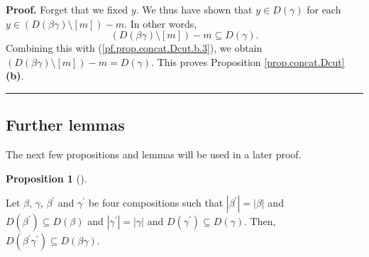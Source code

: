 \documentclass[numbers=enddot,12pt,final,onecolumn,notitlepage]{scrartcl}%
\theoremstyle{definition}
\newtheorem{prop}[theo]{Proposition}
\newenvironment{proposition}[1][]
{\begin{prop}[#1]\begin{leftbar}}
{\end{leftbar}\end{prop}}
\newenvironment{proof}[1][Proof]{\noindent\textbf{#1.} }{\ \rule{0.5em}{0.5em}}
\begin{document}
\begin{proof}
Forget that we fixed $y$. We thus have shown that $y\in D\left(
\gamma\right)  $ for each $y\in\left(  D\left(  \beta\gamma\right)
\setminus\left[  m\right]  \right)  -m$. In other words,%
\[
\left(  D\left(  \beta\gamma\right)  \setminus\left[  m\right]  \right)
-m\subseteq D\left(  \gamma\right)  .
\]
Combining this with (\ref{pf.prop.concat.Dcut.b.3}), we obtain $\left(
D\left(  \beta\gamma\right)  \setminus\left[  m\right]  \right)  -m=D\left(
\gamma\right)  $. This proves Proposition \ref{prop.concat.Dcut} \textbf{(b)}.
\end{proof}

\subsection{Further lemmas}

The next few propositions and lemmas will be used in a later proof.

\begin{proposition}
\label{prop.concat.2}Let $\beta$, $\gamma$, $\beta^{\prime}$ and
$\gamma^{\prime}$ be four compositions such that $\left\vert \beta^{\prime
}\right\vert =\left\vert \beta\right\vert $ and $D\left(  \beta^{\prime
}\right)  \subseteq D\left(  \beta\right)  $ and $\left\vert \gamma^{\prime
}\right\vert =\left\vert \gamma\right\vert $ and $D\left(  \gamma^{\prime
}\right)  \subseteq D\left(  \gamma\right)  $. Then, $D\left(  \beta^{\prime
}\gamma^{\prime}\right)  \subseteq D\left(  \beta\gamma\right)  $.
\end{proposition}
\end{document}
